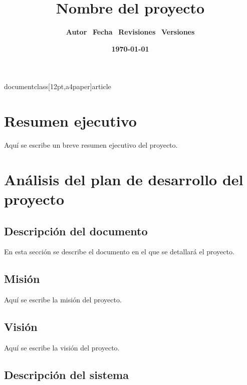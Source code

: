 documentclass[12pt,a4paper]{article}

\usepackage[utf8]{inputenc}
\usepackage[T1]{fontenc}
\usepackage[spanish]{babel}
\usepackage{amsmath,amssymb,amsfonts,amsthm}
\usepackage{graphicx}
\usepackage{hyperref}
\usepackage{url}
\usepackage{cite}

\title{\textbf{Nombre del proyecto}}
\author{\textbf{Autor} \ \textbf{Fecha} \ \textbf{Revisiones} \ \textbf{Versiones}}
\date{\textbf{\today}}



\maketitle

\section{\textbf{Resumen ejecutivo}}

Aquí se escribe un breve resumen ejecutivo del proyecto.

\section{\textbf{Análisis del plan de desarrollo del proyecto}}

\subsection{\textbf{Descripción del documento}}

En esta sección se describe el documento en el que se detallará el proyecto.

\subsection{\textbf{Misión}}

Aquí se escribe la misión del proyecto.

\subsection{\textbf{Visión}}

Aquí se escribe la visión del proyecto.

\subsection{\textbf{Descripción del sistema}}

